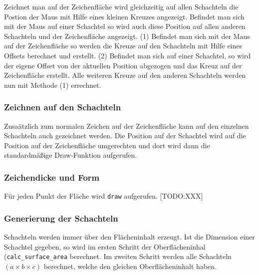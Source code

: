 Zeichnet man auf der Zeichenfläche wird gleichzeitig auf allen Schachteln die Postion der Maus mit Hilfe eines kleinen Kreuzes angezeigt. Befindet man sich mit der Maus auf einer Schachtel so wird auch diese Position auf allen anderen Schachteln und der Zeichenfläche angezeigt.
(1) Befindet man sich mit der Maus auf der Zeichenfläche so werden die Kreuze auf den Schachteln mit Hilfe eines Offsets berechnet und erstellt.
(2) Befindet man sich auf einer Schachtel, so wird der eigene Offset von der aktuellen Position abgezogen und das Kreuz auf der Zeichenfläche erstellt. Alle weiteren Kreuze auf den anderen Schachteln werden nun mit Methode (1) errechnet.


\subsubsection{Zeichnen auf den Schachteln}
\label{subsubsec:zeichnenaufbox}

Zusaätzlich zum normalen Zeichen auf der Zeichenfläche kann auf den einzelnen Schachteln auch gezeichnet werden. Die Position auf der Schachtel wird auf die Position auf der Zeichenfläche umgerechten und dort wird dann die standardmäßige Draw-Funktion aufgerufen.


\subsubsection{Zeichendicke und Form}
\label{subsubsec:zeichendickeForm}

Für jeden Punkt der Fläche wird \texttt{draw} aufgerufen.
[TODO:XXX]


\subsubsection{Generierung der Schachteln}
\label{subsubsec:generierungPreview}
Schachteln werden immer über den Flächeninhalt erzeugt. Ist die Dimension einer Schachtel gegeben, so wird im ersten Schritt der Oberflächeninhal (\texttt{calc\_surface\_area} berechnet. Im zweiten Schritt werden alle Schachteln $(a\times b \times c)$ berechnet, welche den gleichen Oberflächeninhalt haben.

